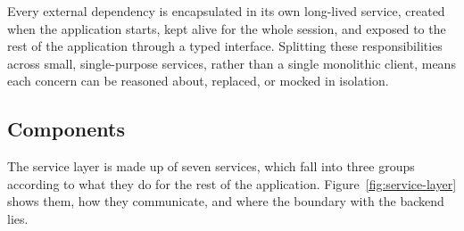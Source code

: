 Every external dependency is encapsulated in its own long-lived service, created when the application starts, kept alive for the whole session, and exposed to the rest of the application through a typed interface. Splitting these responsibilities across small, single-purpose services, rather than a single monolithic client, means each concern can be reasoned about, replaced, or mocked in isolation.

\subsection{Components}

The service layer is made up of seven services, which fall into three groups according to what they do for the rest of the application. Figure~\ref{fig:service-layer} shows them, how they communicate, and where the boundary with the backend lies.

